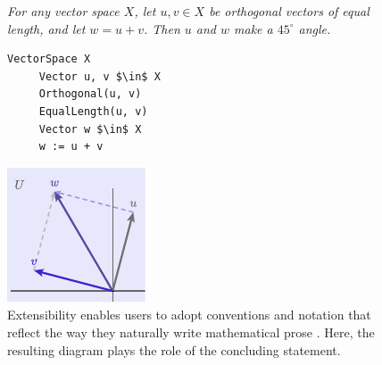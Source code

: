 \begin{figure}[t]
   \centering
   \hspace{-.5em}\begin{minipage}{120pt}
      \small\emph{For any vector space \(X\), let \(u, v \in X\) be orthogonal vectors of equal length, and let \(w = u+v\).  Then \(u\) and \(w\) make a \(45^\circ\) angle.}
   \end{minipage}
   \hspace{-.5em}\begin{minipage}{160pt}
  \begin{lstlisting}[language=Sub-LA,escapechar=@,numbers=none]
     VectorSpace X
     Vector u, v $\in$ X
     Orthogonal(u, v)
     EqualLength(u, v)
     Vector w $\in$ X
     w := u + v\end{lstlisting}
   \end{minipage}
   \hspace{.5em}\begin{minipage}{120pt}
      \includegraphics[width=\linewidth]{assets/penrose/MathProse.pdf}
   \end{minipage}
   \caption{Extensibility enables users to adopt conventions and notation  that reflect the way they naturally write mathematical prose .  Here, the resulting diagram  plays the role of the concluding statement.\label{fig:MathProse}}
\end{figure}


